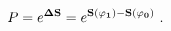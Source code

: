 \begin{equation}\label{HM2}
P = e^{\bf \Delta S}= e^{\bf S(\varphi_1)-\bf S(\varphi_0)}
\ .
\end{equation} 
